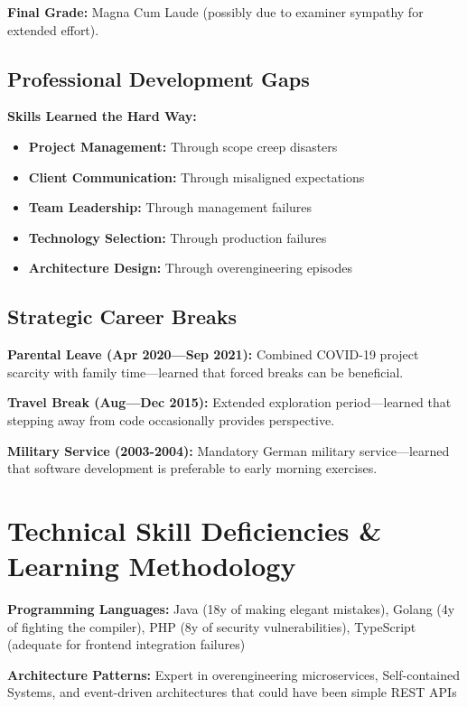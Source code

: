 \documentclass[10pt,a4paper]{article}
\begin{document}
\textbf{Final Grade:} Magna Cum Laude (possibly due to examiner sympathy for extended effort).

\subsection{Professional Development Gaps}

\textbf{Skills Learned the Hard Way:}
\begin{itemize}
\item \textbf{Project Management:} Through scope creep disasters
\item \textbf{Client Communication:} Through misaligned expectations
\item \textbf{Team Leadership:} Through management failures
\item \textbf{Technology Selection:} Through production failures
\item \textbf{Architecture Design:} Through overengineering episodes
\end{itemize}

\subsection{Strategic Career Breaks}

\textbf{Parental Leave (Apr 2020—Sep 2021):} Combined COVID-19 project scarcity with family time—learned that forced breaks can be beneficial.

\textbf{Travel Break (Aug—Dec 2015):} Extended exploration period—learned that stepping away from code occasionally provides perspective.

\textbf{Military Service (2003-2004):} Mandatory German military service—learned that software development is preferable to early morning exercises.

\section{Technical Skill Deficiencies \& Learning Methodology}

\textbf{Programming Languages:} Java (18y of making elegant mistakes), Golang (4y of fighting the compiler), PHP (8y of security vulnerabilities), TypeScript (adequate for frontend integration failures)

\textbf{Architecture Patterns:} Expert in overengineering microservices, Self-contained Systems, and event-driven architectures that could have been simple REST APIs
\end{document}
